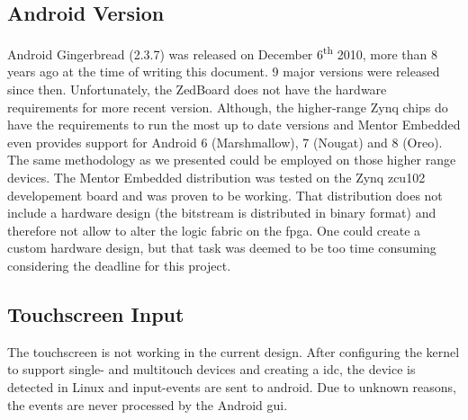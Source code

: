 \subsection{Android Version}
Android Gingerbread (2.3.7) was released on December 6\textsuperscript{th} 2010,
more than 8 years ago at the time of writing this document.
9 major versions were released since then.
Unfortunately, the ZedBoard does not have the hardware requirements for more
recent version.
Although, the higher-range Zynq chips do have the requirements to run the most
up to date versions and Mentor Embedded even provides support for Android 6
(Marshmallow), 7 (Nougat) and 8 (Oreo).
The same methodology as we presented could be employed on those higher range
devices.
The Mentor Embedded distribution was tested on the Zynq zcu102 developement
board and was proven to be working.
That distribution does not include a hardware design (the bitstream is
distributed in binary format) and therefore not allow to alter the logic fabric
on the \gls{fpga}.
One could create a custom hardware design, but that task was deemed to be too
time consuming considering the deadline for this project.

\subsection{Touchscreen Input}
The touchscreen is not working in the current design.
After configuring the kernel to support single- and multitouch devices and
creating a \gls{idc}, the device is detected in Linux and input-events are sent
to android.
Due to unknown reasons, the events are never processed by the Android \gls{gui}.


